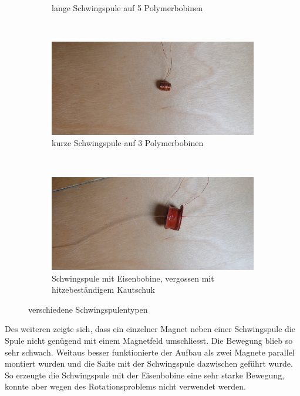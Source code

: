 \begin{figure}[H]
\begin{subfigure}{0.7\textwidth}
		\caption{lange Schwingspule auf 5 Polymerbobinen}
		\label{pics:voicecoil_long}
		\vspace{4mm}
	\end{subfigure}\\
	\begin{subfigure}{0.7\textwidth}
		\centering
		\includegraphics[width=\textwidth]{pictures/Schwingspule_kurz.jpg}
		\caption{kurze Schwingspule auf 3 Polymerbobinen}
		\label{pics:voicecoil_short}
		\vspace{4mm}
	\end{subfigure}\\
	\begin{subfigure}{0.7\textwidth}
		\centering
		\includegraphics[width=\textwidth]{pictures/Schwingspule_eisenbobine.jpg}
		\caption{Schwingspule mit Eisenbobine, vergossen mit hitzebeständigem Kautschuk}
		\label{pics:voicecoil_iron}
		\vspace{4mm}
	\end{subfigure}
	\caption{verschiedene Schwingspulentypen}
	\label{pics:all_voicecoils}
\end{figure}
\noindent Des weiteren zeigte sich, dass ein einzelner Magnet neben einer Schwingspule die Spule nicht genügend mit einem Magnetfeld umschliesst. Die Bewegung blieb so sehr schwach. Weitaus besser funktionierte der Aufbau als zwei Magnete parallel montiert wurden und die Saite mit der Schwingspule dazwischen geführt wurde. So erzeugte die Schwingspule mit der Eisenbobine eine sehr starke Bewegung, konnte aber wegen des Rotationsproblems nicht verwendet werden.
